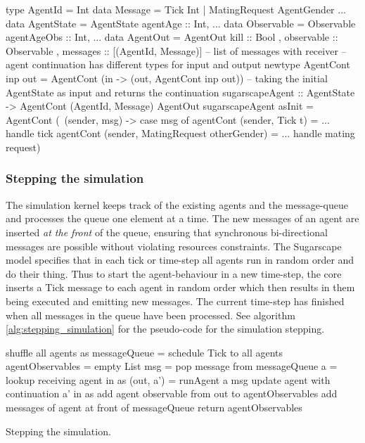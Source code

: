 \begin{HaskellCode}
type AgentId    = Int
data Message    = Tick Int | MatingRequest AgentGender ... 
data AgentState = AgentState { agentAge :: Int, ... }             
data Observable = Observable { agentAgeObs :: Int, ... } 
data AgentOut   = AgentOut
  { kill       :: Bool
  , observable :: Observable
  , messages   :: [(AgentId, Message)] -- list of messages with receiver
  }
-- agent continuation has different types for input and output
newtype AgentCont inp out = AgentCont (in -> (out, AgentCont inp out))
-- taking the initial AgentState as input and returns the continuation
sugarscapeAgent :: AgentState -> AgentCont (AgentId, Message) AgentOut
sugarscapeAgent asInit = AgentCont (\ (sender, msg) -> 
  case msg of
    agentCont (sender, Tick t) = ... handle tick
    agentCont (sender, MatingRequest otherGender) = ... handle mating request)
\end{HaskellCode}

\subsubsection{Stepping the simulation}
The simulation kernel keeps track of the existing agents and the message-queue and processes the queue one element at a time. The new messages of an agent are inserted \textit{at the front} of the queue, ensuring that synchronous bi-directional messages are possible without violating resources constraints. The Sugarscape model specifies that in each tick or time-step all agents run in random order and do their thing. Thus to start the agent-behaviour in a new time-step, the core inserts a Tick message to each agent in random order which then results in them being executed and emitting new messages. The current time-step has finished when all messages in the queue have been processed. See algorithm \ref{alg:stepping_simulation} for the pseudo-code for the simulation stepping.

\begin{algorithm}
shuffle all agents as\;
messageQueue = schedule Tick to all agents\;
agentObservables = empty List\;
 {
  msg = pop message from messageQueue\;
  a = lookup receiving agent in as\;
  (out, a') = runAgent a msg\;
  update agent with continuation a' in as\;
  add agent observable from out to agentObservables\;
  add messages of agent at front of messageQueue\;
}
return agentObservables\;
\caption{Stepping the simulation.}
\end{algorithm}
\label{alg:stepping_simulation}

